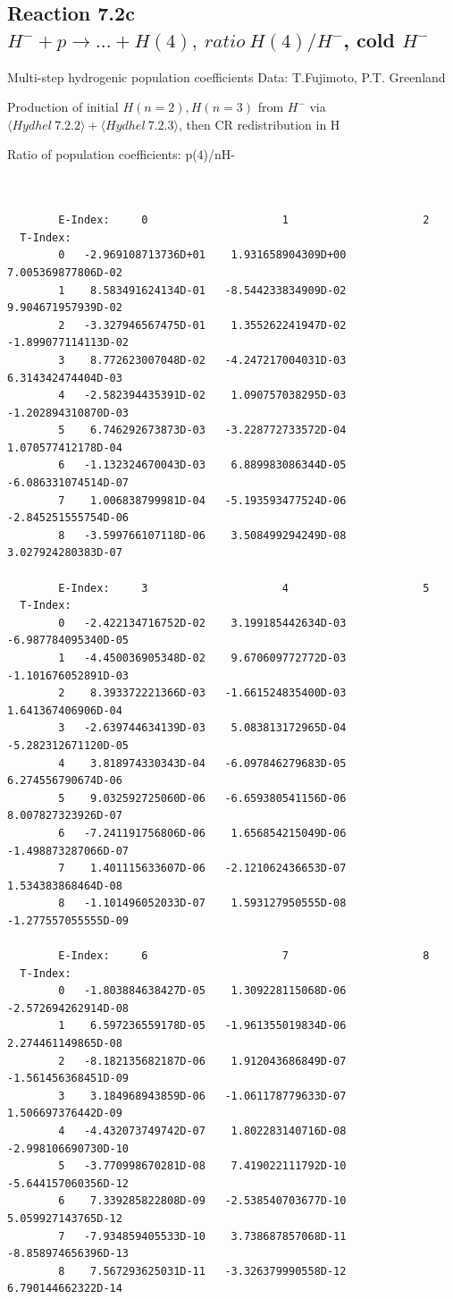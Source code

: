 \documentclass[12pt,dvips]{article}
\begin{document}
\subsection{
Reaction 7.2c $ H^- + p \rightarrow ...+ H(4) , \  ratio ~ H(4)/H^- $, cold $H^-$
}

 Multi-step hydrogenic population coefficients
 Data: T.Fujimoto, P.T. Greenland

Production of initial $H(n=2), H(n=3)$ from $H^-$ via $ \langle Hydhel~ 7.2.2\rangle + \langle Hydhel~ 7.2.3\rangle$,
 then CR redistribution in H

 Ratio of population coefficients: p(4)/nH-

\begin{small}\begin{verbatim}


        E-Index:     0                     1                     2
  T-Index:
        0   -2.969108713736D+01    1.931658904309D+00    7.005369877806D-02
        1    8.583491624134D-01   -8.544233834909D-02    9.904671957939D-02
        2   -3.327946567475D-01    1.355262241947D-02   -1.899077114113D-02
        3    8.772623007048D-02   -4.247217004031D-03    6.314342474404D-03
        4   -2.582394435391D-02    1.090757038295D-03   -1.202894310870D-03
        5    6.746292673873D-03   -3.228772733572D-04    1.070577412178D-04
        6   -1.132324670043D-03    6.889983086344D-05   -6.086331074514D-07
        7    1.006838799981D-04   -5.193593477524D-06   -2.845251555754D-06
        8   -3.599766107118D-06    3.508499294249D-08    3.027924280383D-07

        E-Index:     3                     4                     5
  T-Index:
        0   -2.422134716752D-02    3.199185442634D-03   -6.987784095340D-05
        1   -4.450036905348D-02    9.670609772772D-03   -1.101676052891D-03
        2    8.393372221366D-03   -1.661524835400D-03    1.641367406906D-04
        3   -2.639744634139D-03    5.083813172965D-04   -5.282312671120D-05
        4    3.818974330343D-04   -6.097846279683D-05    6.274556790674D-06
        5    9.032592725060D-06   -6.659380541156D-06    8.007827323926D-07
        6   -7.241191756806D-06    1.656854215049D-06   -1.498873287066D-07
        7    1.401115633607D-06   -2.121062436653D-07    1.534383868464D-08
        8   -1.101496052033D-07    1.593127950555D-08   -1.277557055555D-09

        E-Index:     6                     7                     8
  T-Index:
        0   -1.803884638427D-05    1.309228115068D-06   -2.572694262914D-08
        1    6.597236559178D-05   -1.961355019834D-06    2.274461149865D-08
        2   -8.182135682187D-06    1.912043686849D-07   -1.561456368451D-09
        3    3.184968943859D-06   -1.061178779633D-07    1.506697376442D-09
        4   -4.432073749742D-07    1.802283140716D-08   -2.998106690730D-10
        5   -3.770998670281D-08    7.419022111792D-10   -5.644157060356D-12
        6    7.339285822808D-09   -2.538540703677D-10    5.059927143765D-12
        7   -7.934859405533D-10    3.738687857068D-11   -8.858974656396D-13
        8    7.567293625031D-11   -3.326379990558D-12    6.790144662322D-14


\end{verbatim}
\end{small}
\end{document}
